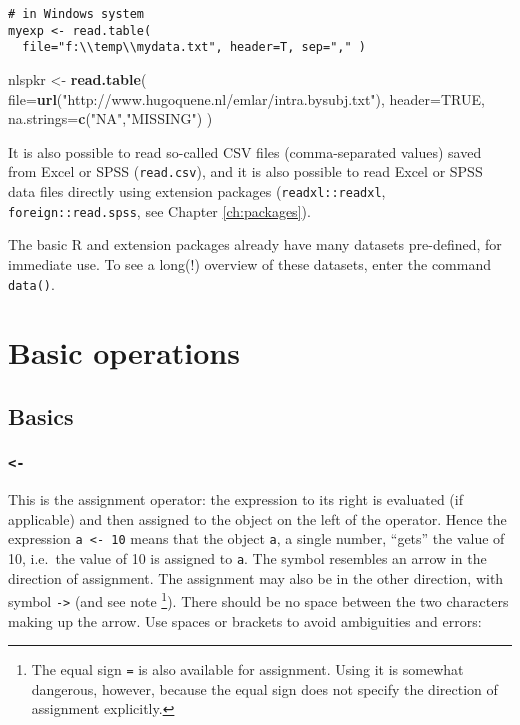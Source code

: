 \documentclass[]{book}
\newenvironment{Shaded}{\begin{snugshade}}{\end{snugshade}}
\newcommand{\DataTypeTok}[1]{\textcolor[rgb]{0.13,0.29,0.53}{#1}}
\newcommand{\KeywordTok}[1]{\textcolor[rgb]{0.13,0.29,0.53}{\textbf{#1}}}
\newcommand{\NormalTok}[1]{#1}
\newcommand{\OtherTok}[1]{\textcolor[rgb]{0.56,0.35,0.01}{#1}}
\newcommand{\StringTok}[1]{\textcolor[rgb]{0.31,0.60,0.02}{#1}}
\begin{document}
\begin{verbatim}
# in Windows system
myexp <- read.table(
  file="f:\\temp\\mydata.txt", header=T, sep="," )
\end{verbatim}

\begin{Shaded}
\begin{Highlighting}[]
\NormalTok{nlspkr <-}\StringTok{ }\KeywordTok{read.table}\NormalTok{(}
  \DataTypeTok{file=}\KeywordTok{url}\NormalTok{(}\StringTok{"http://www.hugoquene.nl/emlar/intra.bysubj.txt"}\NormalTok{),}
  \DataTypeTok{header=}\OtherTok{TRUE}\NormalTok{, }\DataTypeTok{na.strings=}\KeywordTok{c}\NormalTok{(}\StringTok{"NA"}\NormalTok{,}\StringTok{"MISSING"}\NormalTok{) )}
\end{Highlighting}
\end{Shaded}

It is also possible to read so-called CSV files (comma-separated values) saved from Excel or SPSS (\texttt{read.csv}), and it is also possible to read Excel or SPSS data files directly using extension packages (\texttt{readxl::readxl}, \texttt{foreign::read.spss}, see Chapter \ref{ch:packages}).

The basic R and extension packages already have many
datasets pre-defined, for immediate use.
To see a long(!) overview of these datasets, enter the command \texttt{data()}.

\hypertarget{ch:basicoperations}{%
\chapter{Basic operations}\label{ch:basicoperations}}

\hypertarget{sub:basics}{%
\section{Basics}\label{sub:basics}}

\hypertarget{section}{%
\subsection{\texorpdfstring{\texttt{\textless{}-}}{\textless{}-}}\label{section}}

This is the assignment operator: the expression to its right is
evaluated (if applicable) and then assigned to the object on the
left of the operator. Hence the expression
\texttt{a\ \textless{}-\ 10} means that the object \texttt{a}, a single
number, ``gets'' the value of 10, i.e.~the value of 10 is assigned to \texttt{a}.
The symbol resembles
an arrow in the direction of assignment. The assignment may also be
in the other direction, with symbol \texttt{-\textgreater{}} (and see note
\footnote{The equal sign \texttt{=} is also available for assignment. Using
  it is somewhat dangerous, however, because the equal sign does not
  specify the direction of assignment explicitly.}).
There should be no space between the two characters making up the arrow.
Use spaces or brackets to avoid ambiguities and errors:
\end{document}
